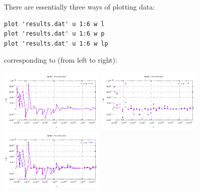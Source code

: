 There are essentially three ways of plotting data: 
\begin{verbatim}
plot 'results.dat' u 1:6 w l 
plot 'results.dat' u 1:6 w p
plot 'results.dat' u 1:6 w lp
\end{verbatim}
corresponding to (from left to right):
\begin{center}
\includegraphics[width=5cm]{images/gnuplot/results_a.pdf}
\includegraphics[width=5cm]{images/gnuplot/results_b.pdf}
\includegraphics[width=5cm]{images/gnuplot/results_c.pdf}
\end{center}

